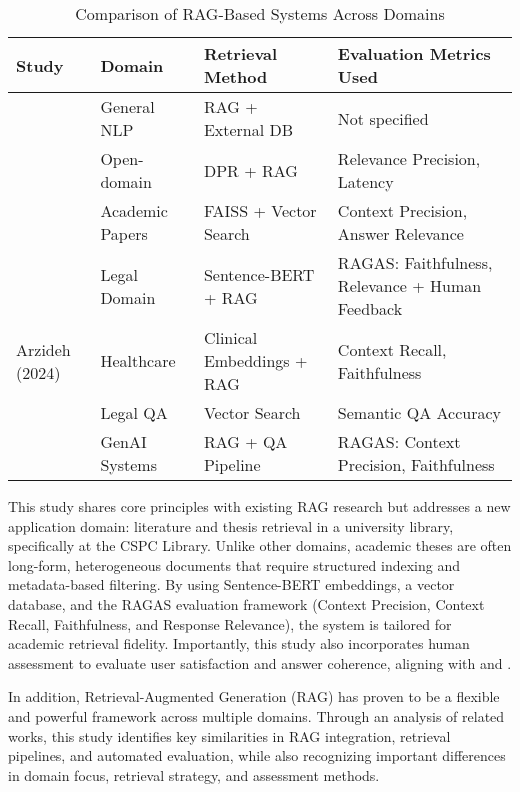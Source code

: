 \begin{refsection}
\begin{table}[H]
\centering
\caption{Comparison of RAG-Based Systems Across Domains}
\begin{tabular}{|p{3.5cm}|p{2.5cm}|p{3.5cm}|p{4.5cm}|}
\hline
\textbf{Study} & \textbf{Domain} & \textbf{Retrieval Method} & \textbf{Evaluation Metrics Used} \\
\hline
\citeauthor{thapa2022splitfed} \citeyear{thapa2022splitfed} & General NLP & RAG + External DB & Not specified \\
\citeauthor{lewis2020retrieval} \citeyear{lewis2020retrieval} & Open-domain & DPR + RAG & Relevance Precision, Latency \\
\citeauthor{grigoryan2024building} \citeyear{grigoryan2024building} & Academic Papers & FAISS + Vector Search & Context Precision, Answer Relevance \\
\citeauthor{aquino2024extracting} \citeyear{aquino2024extracting} & Legal Domain & Sentence-BERT + RAG & RAGAS: Faithfulness, Relevance + Human Feedback \\
Arzideh (2024) & Healthcare & Clinical Embeddings + RAG & Context Recall, Faithfulness \\
\citeauthor{ryu2023retrieval} \citeyear{ryu2023retrieval} & Legal QA & Vector Search & Semantic QA Accuracy \\
\citeauthor{sagi2024genai} \citeyear{sagi2024genai} & GenAI Systems & RAG + QA Pipeline & RAGAS: Context Precision, Faithfulness \\
\hline
\end{tabular}
\label{tab:rag_comparison}
\end{table}

This study shares core principles with existing RAG research but addresses a new application domain: literature and thesis retrieval in a university library, specifically at the CSPC Library. Unlike other domains, academic theses are often long-form, heterogeneous documents that require structured indexing and metadata-based filtering.
By using Sentence-BERT embeddings, a vector database, and the RAGAS evaluation framework (Context Precision, Context Recall, Faithfulness, and Response Relevance), the system is tailored for academic retrieval fidelity. Importantly, this study also incorporates human assessment to evaluate user satisfaction and answer coherence, aligning with \citeauthor{aquino2024extracting} \citeyear{aquino2024extracting} and \citeauthor{sivasothy2024ragprobe} \citeyear{sivasothy2024ragprobe}.

In addition, Retrieval-Augmented Generation (RAG) has proven to be a flexible and powerful framework across multiple domains. Through an analysis of related works, this study identifies key similarities in RAG integration, retrieval pipelines, and automated evaluation, while also recognizing important differences in domain focus, retrieval strategy, and assessment methods.


\end{refsection}
